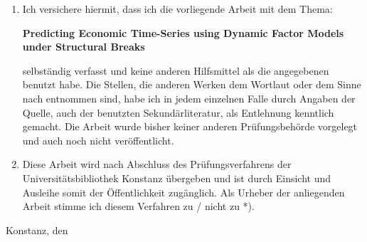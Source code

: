 \documentclass[12pt]{article}
\begin{document}
\raggedright
\begin{enumerate}
\item{ Ich versichere hiermit, dass ich die vorliegende Arbeit mit dem Thema: \\
\vspace{0.5cm}
\begin{center}
	\textbf{Predicting Economic Time-Series using Dynamic Factor Models under Structural Breaks}
\end{center}

selbständig verfasst und keine anderen Hilfsmittel als die angegebenen benutzt habe.
Die Stellen, die anderen Werken dem Wortlaut oder dem Sinne nach entnommen sind,
habe ich in jedem einzelnen Falle durch Angaben der Quelle, auch der benutzten
Sekundärliteratur, als Entlehnung kenntlich gemacht. Die Arbeit wurde bisher keiner
anderen Prüfungsbehörde vorgelegt und auch noch nicht veröffentlicht.}

\item{Diese Arbeit wird nach Abschluss des Prüfungsverfahrens der Universitätsbibliothek
Konstanz übergeben und ist durch Einsicht und Ausleihe somit der Öffentlichkeit
zugänglich. Als Urheber der anliegenden Arbeit stimme ich diesem Verfahren zu / nicht
zu *).}
\end{enumerate}

\vspace{1cm}
Konstanz, den \underline{\hspace{3.3cm}} \hspace{3cm} \underline{\hspace{6cm}}
\end{document}
